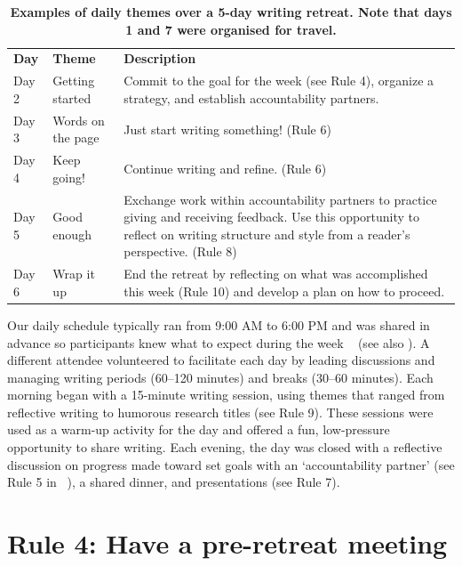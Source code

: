 \documentclass[10pt,letterpaper]{article}
\newlength\savedwidth
\newcommand\thickhline{\noalign{\global\savedwidth\arrayrulewidth\global\arrayrulewidth 2pt}%
\hline
\noalign{\global\arrayrulewidth\savedwidth}}
\begin{document}
\begin{table}[!ht]
\centering
\caption{{\bf Examples of daily themes over a 5-day writing retreat. Note that days 1 and 7 were organised for travel.}}
\begin{tabular}{p{1in}p{2in}p{2in}}
\hline
{\bf Day} & {\bf Theme} & {\bf Description}\\ \thickhline
Day 2 & Getting started & Commit to the goal for the week (see Rule 4), organize a strategy, and establish accountability partners.\\ \hline
Day 3 & Words on the page & Just start writing something! (Rule 6)\\ \hline
Day 4 & Keep going! & Continue writing and refine. (Rule 6)\\ \hline
Day 5 & Good enough & Exchange work within accountability partners to practice giving and receiving feedback. Use this opportunity to reflect on writing structure and style from a reader's perspective. (Rule 8)\\ \hline
Day 6 & Wrap it up & End the retreat by reflecting on what was accomplished this week (Rule 10) and develop a plan on how to proceed.\\ \hline
\end{tabular}
\label{table1}
\end{table}

Our daily schedule typically ran from 9:00 AM to 6:00 PM and was shared in advance so participants knew what to expect during the week ~\cite{tremblay2021} (see also ). A different attendee volunteered to facilitate each day by leading discussions and managing writing periods (60--120 minutes) and breaks (30--60 minutes). Each morning began with a 15-minute writing session, using themes that ranged from reflective writing to humorous research titles (see Rule 9). These sessions were used as a warm-up activity for the day and offered a fun, low-pressure opportunity to share writing. Each evening, the day was closed with a reflective discussion on progress made toward set goals with an `accountability partner' (see Rule 5 in ~\cite{peterson2018}), a shared dinner, and presentations (see Rule 7).

\section*{Rule 4: Have a pre-retreat meeting}
\end{document}
